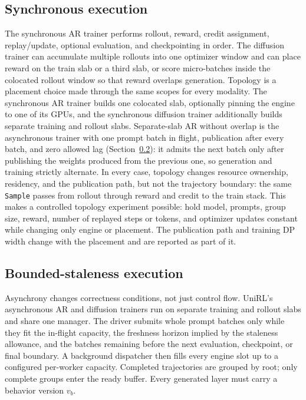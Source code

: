 \documentclass[10pt]{article}
\newcommand{\sample}{\texttt{Sample}}
\begin{document}
\subsection{Synchronous execution}

The synchronous AR trainer performs rollout, reward, credit assignment, replay/update, optional evaluation, and checkpointing in order.
The diffusion trainer can accumulate multiple rollouts into one optimizer window and can place reward on the train slab or a third slab, or score micro-batches inside the colocated rollout window so that reward overlaps generation.
Topology is a placement choice made through the same scopes for every modality.
The synchronous AR trainer builds one colocated slab, optionally pinning the engine to one of its GPUs, and the synchronous diffusion trainer additionally builds separate training and rollout slabs.
Separate-slab AR without overlap is the asynchronous trainer with one prompt batch in flight, publication after every batch, and zero allowed lag (Section~\ref{sec:async}): it admits the next batch only after publishing the weights produced from the previous one, so generation and training strictly alternate.
In every case, topology changes resource ownership, residency, and the publication path, but not the trajectory boundary: the same \sample{} passes from rollout through reward and credit to the train stack.
This makes a controlled topology experiment possible: hold model, prompts, group size, reward, number of replayed steps or tokens, and optimizer updates constant while changing only engine or placement.
The publication path and training DP width change with the placement and are reported as part of it.

\subsection{Bounded-staleness execution}
\label{sec:async}

Asynchrony changes correctness conditions, not just control flow.
UniRL's asynchronous AR and diffusion trainers run on separate training and rollout slabs and share one manager.
The driver submits whole prompt batches only while they fit the in-flight capacity, the freshness horizon implied by the staleness allowance, and the batches remaining before the next evaluation, checkpoint, or final boundary.
A background dispatcher then fills every engine slot up to a configured per-worker capacity.
Completed trajectories are grouped by root; only complete groups enter the ready buffer.
Every generated layer must carry a behavior version $v_b$.
\end{document}
